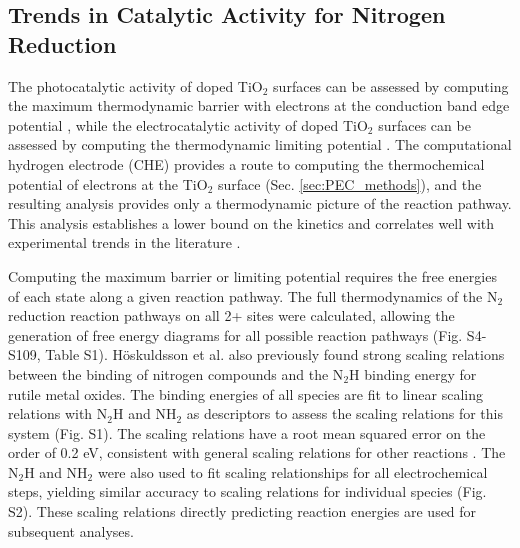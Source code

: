 \subsection{Trends in Catalytic Activity for Nitrogen Reduction}
\label{sec:cat_trends}
The photocatalytic activity of doped TiO$_2$ surfaces can be assessed by computing the maximum thermodynamic barrier with electrons at the conduction band edge potential \cite{Comer_2018}, while the electrocatalytic activity of doped TiO$_2$ surfaces can be assessed by computing the thermodynamic limiting potential \cite{Norskov_2004,Garc_a_Mota_2011}. The computational hydrogen electrode (CHE) provides a route to computing the thermochemical potential of electrons at the TiO$_2$ surface (Sec. \ref{sec:PEC_methods}), and the resulting analysis provides only a thermodynamic picture of the reaction pathway. This analysis establishes a lower bound on the kinetics and correlates well with experimental trends in the literature \cite{Seh_2017}.

Computing the maximum barrier or limiting potential requires the free energies of each state along a given reaction pathway. The full thermodynamics of the N$_2$ reduction reaction pathways on all 2+ sites were calculated, allowing the generation of free energy diagrams for all possible reaction pathways (Fig. S4-S109, Table S1). H\"oskuldsson et al. \cite{Hoskuldsson_2017} also previously found strong scaling relations between the binding of nitrogen compounds and the N$_2$H binding energy for rutile metal oxides. The binding energies of all species are fit to linear scaling relations with N$_2$H and NH$_2$ as descriptors to assess the scaling relations for this system (Fig. S1). The scaling relations have a root mean squared error on the order of 0.2 eV, consistent with general scaling relations for other reactions \cite{Wang_2011}. The N$_2$H and NH$_2$ were also used to fit scaling relationships for all electrochemical steps, yielding similar accuracy to scaling relations for individual species (Fig. S2). These scaling relations directly predicting reaction energies are used for subsequent analyses.









